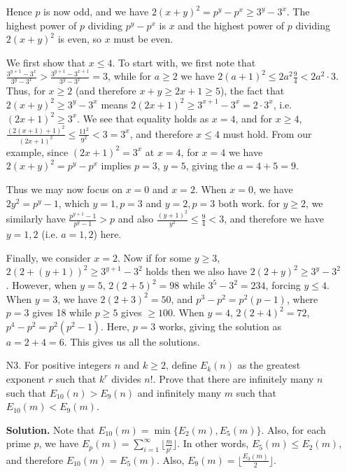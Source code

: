 \documentclass[11pt,a4paper]{article}
\begin{document}
\begin{enumerate}
    	Hence $p$ is now odd, 
    	and we have $2(x + y)^2 = p^y - p^x\ge 3^y - 3^x$. 
    	The highest power of $p$ dividing $p^y - p^x$ is $x$ and the highest power of $p$ dividing $2(x+y)^2$ is even, 
    	so $x$ must be even. 
    	
    	We first show that $x\le 4$. 
    	To start with, we first note that $\frac{3^{y + 1} - 3^x}{3^y - 3^x} > \frac{3^{y + 1} - 3^{x + 1}}{3^y - 3^x} = 3$, 
    	while for $a \ge 2$ we have $2(a + 1)^2 \le 2a^2\frac{9}{4} < 2a^2\cdot 3$. 
    	Thus, for $x\ge 2$ (and therefore $x + y\ge 2x+1\ge 5$), 
    	the fact that $2(x + y)^2\ge 3^y - 3^x$ means 
    	$2(2x + 1)^2 \ge 3^{x + 1} - 3^x = 2\cdot 3^x$, 
    	i.e. $(2x + 1)^2\ge 3^x$. 
    	We see that equality holds as $x = 4$, 
    	and for $x\ge 4$, $\frac{(2(x+1)+1)^2}{(2x + 1)^2}\le \frac{11^2}{9^2} < 3 = 3^x$, 
    	and therefore $x\le 4$ must hold. 
    	From our example, since $(2x + 1)^2= 3^x$ at $x=4$, 
    	for $x=4$ we have $2(x + y)^2 = p^y - p^x$ implies $p=3$, $y=5$, 
    	giving the $a=4 + 5 = 9$. 
    	
    	Thus we may now focus on $x = 0$ and $x = 2$. 
    	When $x = 0$, we have $2y^2 = p^y - 1$, 
    	which $y = 1, p = 3$ and $y=2, p = 3$ both work. 
    	for $y \ge 2$, we similarly have $\frac{p^{y + 1} - 1}{p^y - 1} > p$ and also 
    	$\frac{(y + 1)^2}{y^2}\le \frac{9}{4} < 3$, 
    	and therefore we have $y = 1, 2$ (i.e. $a=1, 2$) here. 
    	
    	Finally, we consider $x = 2$. Now if for some $y\ge 3$, 
    	$2(2 + (y + 1))^2 \ge 3^{y + 1} - 3^2$ holds then 
    	we also have $2(2 + y)^2 \ge 3^{y} - 3^2$. 
    	However, when $y = 5$, 
    	$2(2 + 5)^2 = 98$ while $3^5 - 3^2 = 234$, 
    	forcing $y\le 4$. 
    	When $y = 3$, we have $2(2 + 3)^2 = 50$, 
    	and $p^3 - p^2 = p^2(p - 1)$, 
    	where $p=3$ gives 18 while $p\ge 5$ gives $\ge 100$. 
    	When $y = 4$, $2(2 + 4)^2 = 72$, 
    	$p^4 - p^2 = p^2(p^2 - 1)$. 
    	Here, $p = 3$ works, giving the solution as $a = 2 + 4 = 6$. 
    	This gives us all the solutions. 
    	
    	\item [N3.] For positive integers $n$ and $k \geq 2$, define $E_k(n)$ as the greatest exponent $r$ such that $k^r$ divides $n!$. Prove that there are infinitely many $n$ such that $E_{10}(n) > E_9(n)$ and infinitely many $m$ such that $E_{10}(m) < E_9(m)$.
    	
    	\textbf{Solution.} 
    	Note that $E_{10}(m) = \min\{E_2(m), E_5(m)\}$. 
    	Also, for each prime $p$, 
    	we have $E_p(m) = \sum_{i = 1}^{\infty}\lfloor \frac{m}{p^i}\rfloor$. 
    	In other words, $E_5(m)\le E_2(m)$, and therefore 
    	$E_{10}(m)  = E_5(m)$. 
    	Also, $E_9(m) = \lfloor \frac{E_3(m)}{2}\rfloor$. 
    	

\end{enumerate}
\end{document}
